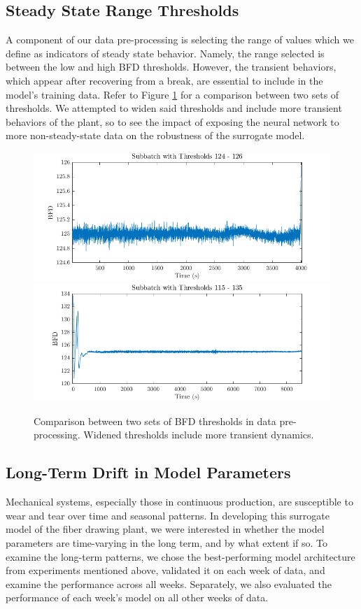 \subsection{Steady State Range Thresholds}
A component of our data pre-processing is selecting the range of values which we define as indicators of steady state behavior. Namely, the range selected is between the low and high BFD thresholds. However, the transient behaviors, which appear after recovering from a break, are essential to include in the model's training data. Refer to Figure \ref{fig:bfd_thresholds} for a comparison between two sets of thresholds. We attempted to widen said thresholds and include more transient behaviors of the plant, so to see the impact of exposing the neural network to more non-steady-state data on the robustness of the surrogate model. 

\begin{figure}[ht]
    \centering
    \includegraphics[width=\textwidth]{figures/thres_124126.png}
    \includegraphics[width=\textwidth]{figures/thres_115135.png}
    \caption{Comparison between two sets of BFD thresholds in data pre-processing. Widened thresholds include more transient dynamics. }
    \label{fig:bfd_thresholds}
\end{figure}

\subsection{Long-Term Drift in Model Parameters}
Mechanical systems, especially those in continuous production, are susceptible to wear and tear over time and seasonal patterns. In developing this surrogate model of the fiber drawing plant, we were interested in whether the model parameters are time-varying in the long term, and by what extent if so. To examine the long-term patterns, we chose the best-performing model architecture from experiments mentioned above, validated it on each week of data, and examine the performance across all weeks. Separately, we also evaluated the performance of each week's model on all other weeks of data. 

